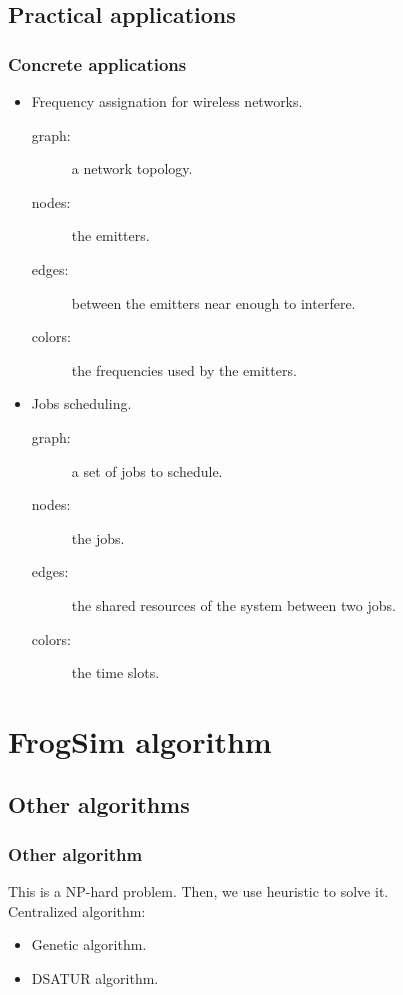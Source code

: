 \documentclass{beamer}
\begin{document}
\subsection{Practical applications}

\begin{frame}
\frametitle{Concrete applications}
\begin{itemize}
	\item Frequency assignation for wireless networks.
		\begin{description}
			\item[graph:] a network topology.
			\item[nodes:] the emitters.
			\item[edges:] between the emitters near enough to interfere.
			\item[colors:] the frequencies used by the emitters.
		\end{description}
	\item Jobs scheduling.
		\begin{description}
			\item[graph:] a set of jobs to schedule.
			\item[nodes:] the jobs.
			\item[edges:] the shared resources of the system between two jobs.
			\item[colors:] the time slots.
		\end{description}
\end{itemize}
\end{frame}

\section{FrogSim algorithm}

\subsection{Other algorithms}

\begin{frame}
\frametitle{Other algorithm}
This is a NP-hard problem. Then, we use heuristic to solve it.\\
Centralized algorithm:
\begin{itemize}
	\item Genetic algorithm.
	\item DSATUR algorithm.
\end{itemize}

\end{frame}
\end{document}
